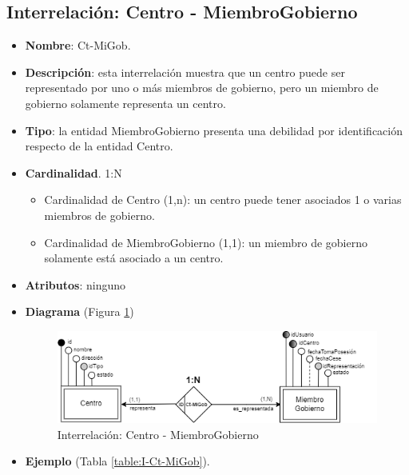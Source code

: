 \subsection{Interrelación: Centro - MiembroGobierno}
\begin{itemize}
    \item \textbf{Nombre}: Ct-MiGob.
    \item \textbf{Descripción}: esta interrelación muestra que un centro puede ser representado por uno o más miembros de gobierno, pero un miembro de gobierno solamente representa un centro.
    \item \textbf{Tipo}: la entidad MiembroGobierno presenta una debilidad por identificación respecto de la entidad Centro.
    \item \textbf{Cardinalidad}. 1:N
    \begin{itemize}
        \item Cardinalidad de Centro (1,n): un centro puede tener asociados 1 o varias miembros de gobierno.
        \item Cardinalidad de MiembroGobierno (1,1): un miembro de gobierno solamente está asociado a un centro.
    \end{itemize}
    \item \textbf{Atributos}: ninguno
    \item \textbf{Diagrama} (Figura \ref{fig:I-Ct-MiGob}) 
    \begin{figure}[H]
        \centering
        \includegraphics[scale=0.7]{img/diagramas/EER/I-Ct-MiGob.png}
        \caption{Interrelación: Centro - MiembroGobierno}
        \label{fig:I-Ct-MiGob}
    \end{figure}
    
    \item \textbf{Ejemplo} (Tabla \ref{table:I-Ct-MiGob}).


\end{itemize}
